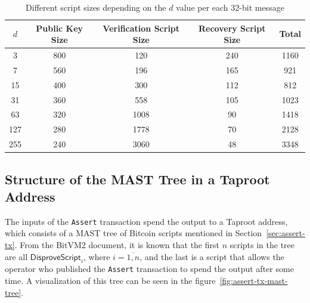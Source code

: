 \documentclass{iacrtrans}
\begin{document}

\begin{table}[h]
  \centering
  \begin{tabular}{ccccc}
    \toprule
    $d$ & Public Key Size & Verification Script Size & Recovery
    Script Size & Total \\
    \midrule
    3 & 800 & 120 & 240 & 1160 \\
    7 & 560 & 196 & 165 & 921 \\
    15 & 400 & 300 & 112 & 812 \\
    31 & 360 & 558 & 105 & 1023 \\
    63 & 320 & 1008 & 90 & 1418 \\
    127 & 280 & 1778 & 70 & 2128 \\
    255 & 240 & 3060 & 48 & 3348 \\
    \bottomrule
  \end{tabular}
  \caption{Different script sizes depending on the $d$
  value per each 32-bit message}\label{tab:winternitz-script-size}
\end{table}

\subsection{Structure of the MAST Tree in a Taproot
Address}\label{sec:mast-tree-structure}

The inputs of the \texttt{Assert} transaction spend the output to a
Taproot address, which consists of a MAST tree of Bitcoin scripts
mentioned in Section~\ref{sec:assert-tx}. From the BitVM2 document, it
is known that the first \(n\) scripts in the tree are all
\(\mathsf{DisproveScript}_i\), where \(i = \overline{1, n}\), and the last is a
script that allows the operator who published the \texttt{Assert}
transaction to spend the output after some time. A visualization of
this tree can be seen in the figure~\ref{fig:assert-tx-mast-tree}.
\end{document}
